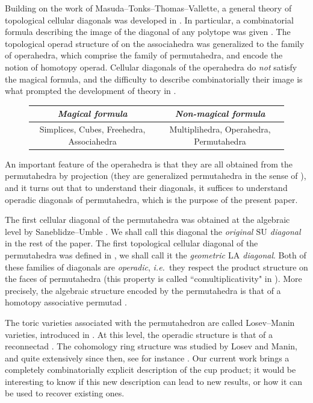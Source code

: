 \documentclass{amsart}
\theoremstyle{definition}
\newcommand{\ie}{\textit{i.e.}~} %
\newcommand{\SU}{\mathrm{SU}}
\newcommand{\LA}{\mathrm{LA}}
\begin{document}
Building on the work of Masuda--Tonks--Thomas--Vallette, a general theory of topological cellular diagonals was developed in \cite{LaplanteAnfossi}.
In particular, a combinatorial formula describing the image of the diagonal of any polytope was given \cite[Thm. 1.26]{LaplanteAnfossi}.
The topological operad structure of \cite{MasudaThomasTonksVallette} on the associahedra was generalized to the family of operahedra, which comprise the family of permutahedra, and encode the notion of homotopy operad.
Cellular diagonals of the operahedra do \emph{not} satisfy the magical formula, and the difficulty to describe combinatorially their image is what prompted the development of theory in \cite{LaplanteAnfossi}.
\begin{figure}[h!]
\begin{center}
\begin{tabular}{c|c}
\emph{Magical formula} & \emph{Non-magical formula} \\
\hline
Simplices, Cubes, Freehedra, Associahedra & Multiplihedra, Operahedra, Permutahedra 
\end{tabular}
\end{center}
\end{figure}
An important feature of the operahedra is that they are all obtained from the permutahedra by projection (they are generalized permutahedra in the sense of \cite{Postnikov}), and it turns out that to understand their diagonals, it suffices to understand operadic diagonals of permutahedra, which is the purpose of the present paper. 

The first cellular diagonal of the permutahedra was obtained at the algebraic level by Saneblidze--Umble \cite{SaneblidzeUmble}.
We shall call this diagonal the \emph{original $\SU$ diagonal} in the rest of the paper. 
The first topological cellular diagonal of the permutahedra was defined in \cite{LaplanteAnfossi}, we shall call it the \emph{geometric $\LA$ diagonal}.
Both of these families of diagonals are \emph{operadic}, \ie they respect the product structure on the faces of permutahedra (this property is called ``comultiplicativity" in \cite{SaneblidzeUmble}).
More precisely, the algebraic structure encoded by the permutahedra is that of a homotopy associative permutad \cite{LodayRonco-permutads,Markl}.

The toric varieties associated with the permutahedron are called Losev--Manin varieties, introduced in \cite{LosevManin}.
At this level, the operadic structure is that of a reconnectad \cite{DotsenkoKeilthyLyskov}. 
The cohomology ring structure was studied by Losev and Manin, and quite extensively since then, see for instance \cite{BergstromMinabe, Lin}. 
Our current work brings a completely combinatorially explicit description of the cup product; it would be interesting to know if this new description can lead to new results, or how it can be used to recover existing ones.
\end{document}
